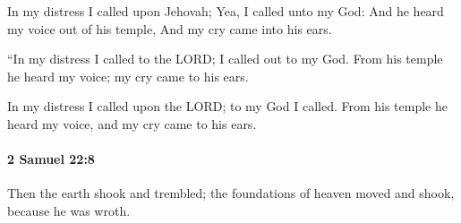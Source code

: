 			\begin{versebox}
					\item[BHS] 
					\item[ASV] In my distress I called upon Jehovah; Yea, I called unto my God: And he heard my voice out of his temple, And my cry came into his ears.
					\item[NIV] “In my distress I called to the LORD; I called out to my God. From his temple he heard my voice; my cry came to his ears.
					\item[NRSV] In my distress I called upon the LORD; to my God I called. From his temple he heard my voice, and my cry came to his ears.
			\end{versebox}

		\paragraph{2 Samuel 22:8} %
			\label{2SAMUEL-22-8}

			Then the earth shook and trembled; the foundations of heaven moved and shook, because he was wroth.

